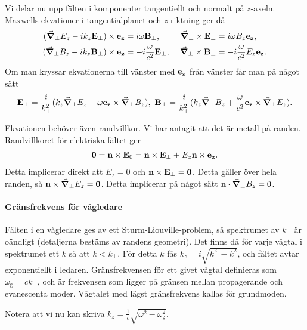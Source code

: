 Vi delar nu upp fälten i komponenter tangentiellt och normalt på $z$-axeln. Maxwells ekvationer i tangentialplanet och $z$-riktning ger då
\begin{alignat*}{3}
	(\gradperp{E_{z}} - ik_{z}\vb{E}_{\perp})\times\ub{z} &= i\omega\vb{B}_{\perp},\      &\gradperp\times\vb{E}_{\perp}            &= i\omega B_{z}\ub{z}, \\
	(\gradperp{B_{z}} - ik_{z}\vb{B}_{\perp})\times\ub{z} &= -i\frac{\omega}{c^{2}}\vb{E}_{\perp},\ &\gradperp\times\vb{B}_{\perp} &= -i\frac{\omega}{c^{2}}E_{z}\ub{z}.
\end{alignat*}
Om man kryssar ekvationerna till vänster med $\vb{e}_{\vb{z}}$ från vänster får man på något sätt
\begin{align*}
	\vb{E}_{\perp} = \frac{i}{k_{\perp}^{2}}(k_{z}\grad_{\perp}{}{E_{z}} - \omega\vb{e}_{\vb{z}}\times\grad_{\perp}{}{B_{z}}),\ \vb{B}_{\perp} = \frac{i}{k_{\perp}^{2}}(k_{z}\grad_{\perp}{}{B_{z}} + \frac{\omega}{c^{2}}\vb{e}_{\vb{z}}\times\grad_{\perp}{}{E_{z}}).
\end{align*}

Ekvationen behöver även randvillkor. Vi har antagit att det är metall på randen. Randvillkoret för elektriska fältet ger
\begin{align*}
	\vb{0} = \vb{n}\times\vb{E}_{0} = \vb{n}\times\vb{E}_{\perp} + E_{z}\vb{n}\times\vb{e}_{\vb{z}}.
\end{align*}
Detta implicerar direkt att $E_{z} = 0$ och $\vb{n}\times\vb{E}_{\perp} = \vb{0}$. Detta gäller över hela randen, så $\vb{n}\times\grad_{\perp}{}{E_{z}} = \vb{0}$. Detta implicerar på något sätt $\vb{n}\cdot\grad_{\perp}{}{B_{z}} = 0$.

\paragraph{Gränsfrekvens för vågledare}
Fälten i en vågledare ges av ett Sturm-Liouville-problem, så spektrumet av $k_{\perp}$ är oändligt (detaljerna bestäms av randens geometri). Det finns då för varje vågtal i spektrumet ett $k$ så att $k < k_{\perp}$. För detta $k$ fås $k_{z} = i\sqrt{k_{\perp}^{2} - k^{2}}$, och fältet avtar exponentiellt i ledaren. Gränsfrekvensen för ett givet vågtal definieras som $\omega_{\text{g}} = ck_{\perp}$, och är frekvensen som ligger på gränsen mellan propagerande och evanescenta moder. Vågtalet med lägst gränsfrekvens kallas för grundmoden.

Notera att vi nu kan skriva $k_{z} = \frac{1}{c}\sqrt{\omega^{2} - \omega_{\text{g}}^{2}}$.